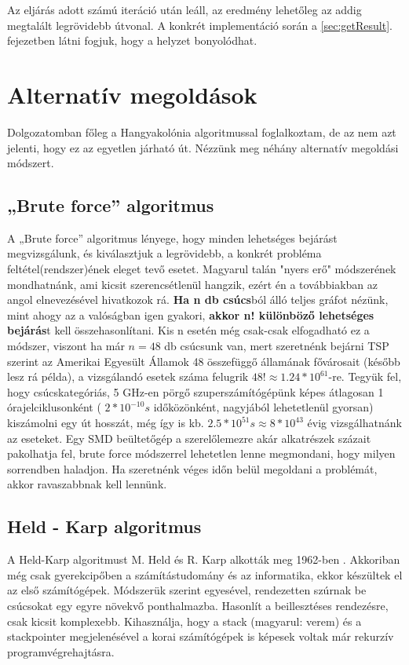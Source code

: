 Az eljárás adott számú iteráció után leáll, az eredmény lehetőleg az addig megtalált legrövidebb útvonal. A konkrét implementáció során a \ref{sec:getResult}. fejezetben látni fogjuk, hogy a helyzet bonyolódhat.

\section{Alternatív megoldások}

Dolgozatomban főleg a Hangyakolónia algoritmussal foglalkoztam, de  az nem azt jelenti, hogy ez az egyetlen járható út. Nézzünk meg néhány alternatív megoldási módszert.

\subsection{„Brute force” algoritmus}
A „Brute force” algoritmus lényege, hogy minden lehetséges bejárást megvizsgálunk, és kiválasztjuk a legrövidebb, a konkrét probléma feltétel(rendszer)ének eleget tevő esetet. Magyarul talán "nyers erő" módszerének mondhatnánk, ami kicsit szerencsétlenül hangzik, ezért én a továbbiakban az angol elnevezésével hivatkozok rá. \textbf{Ha n db csúcs}ból álló teljes gráfot nézünk, mint ahogy az a valóságban igen gyakori, \textbf{akkor n! különböző lehetséges bejárás}t kell összehasonlítani. Kis n esetén még csak-csak elfogadható ez a módszer, viszont ha már \(n=48\) db csúcsunk van, mert szeretnénk bejárni TSP szerint az Amerikai Egyesült Államok 48 összefüggő államának fővárosait (később lesz rá példa), a vizsgálandó esetek száma felugrik \( 48! \approx 1.24 * 10^{61} \)-re. Tegyük fel, hogy csúcskategóriás, 5 GHz-en pörgő szuperszámítógépünk képes átlagosan 1 órajelciklusonként (  \(2*10^{-10}s\) időközönként, nagyjából lehetetlenül gyorsan) kiszámolni egy út hosszát, még így is kb. \(2.5 * 10^{51}s \approx 8 * 10^{43} \) évig vizsgálhatnánk az eseteket. Egy SMD beültetőgép a szerelőlemezre akár alkatrészek százait pakolhatja fel, brute force módszerrel lehetetlen lenne megmondani, hogy milyen sorrendben haladjon. Ha szeretnénk véges időn belül megoldani a problémát, akkor ravaszabbnak kell lennünk.

\subsection{Held - Karp algoritmus }
A Held-Karp algoritmust M. Held és R. Karp alkották meg 1962-ben \cite{HeldKarp}. Akkoriban még csak gyerekcipőben a számítástudomány és az informatika, ekkor készültek el az első számítógépek. Módszerük szerint egyesével, rendezetten szúrnak be csúcsokat egy egyre növekvő ponthalmazba. Hasonlít a beillesztéses rendezésre, csak kicsit komplexebb. Kihasználja, hogy a stack (magyarul: verem) és a stackpointer megjelenésével a korai számítógépek is képesek voltak már rekurzív programvégrehajtásra.
